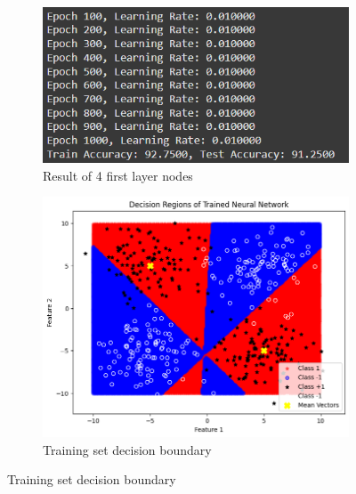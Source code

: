 \documentclass[a4paper,12pt]{article}
\begin{document}
\begin{figure}[H]
    \centering
    \captionsetup[subfigure]{list=true} %

    \begin{subfigure}{0.5\textwidth}
        \centering
        \includegraphics[width=\textwidth]{3.2_4_r.png}
        \caption{Result of 4 first layer nodes}
    \end{subfigure}
    \begin{subfigure}{0.45\textwidth}
        \centering
        \includegraphics[width=\textwidth]{3.2_4_Train.png}
        \caption{Training set decision boundary}
    \end{subfigure}


\end{figure}
\end{document}

